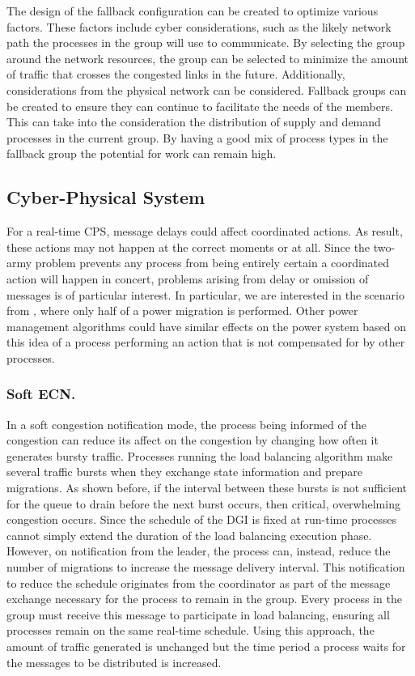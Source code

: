 The design of the fallback configuration can be created to optimize various factors.
These factors include cyber considerations, such as the likely network path the processes in the group will use to communicate.
By selecting the group around the network resources, the group can be selected to minimize the amount of traffic that crosses the congested links in the future.
Additionally, considerations from the physical network can be considered.
Fallback groups can be created to ensure they can continue to facilitate the needs of the members.
This can take into the consideration the distribution of supply and demand processes in the current group.
By having a good mix of process types in the fallback group the potential for work can remain high.

\subsection{Cyber-Physical System}

For a real-time \ac{CPS}, message delays could affect coordinated actions.
As result, these actions may not happen at the correct moments or at all.
Since the two-army problem prevents any process from being entirely certain a coordinated action will happen in concert, problems arising from delay or omission of messages is of particular interest.
In particular, we are interested in the scenario from \cite{HARINI}, where only half of a power migration is performed.
Other power management algorithms could have similar effects on the power system based on this idea of a process performing an action that is not compensated for by other processes.

\subsubsection{Soft \ac{ECN}.}

In a soft congestion notification mode, the process being informed of the congestion can reduce its affect on the congestion by changing how often it generates bursty traffic.
Processes running the load balancing algorithm make several traffic bursts when they exchange state information and prepare migrations.
As shown before, if the interval between these bursts is not sufficient for the queue to drain before the next burst occurs, then critical, overwhelming congestion occurs.
Since the schedule of the \ac{DGI} is fixed at run-time processes cannot simply extend the duration of the load balancing execution phase.
However, on notification from the leader, the process can, instead, reduce the number of migrations to increase the message delivery interval.
This notification to reduce the schedule originates from the coordinator as part of the message exchange necessary for the process to remain in the group.
Every process in the group must receive this message to participate in load balancing, ensuring all processes remain on the same real-time schedule.
Using this approach, the amount of traffic generated is unchanged but the time period a process waits for the messages to be distributed is increased.

